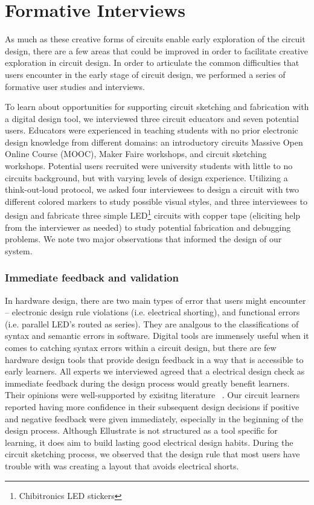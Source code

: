 \documentclass{sigchi}
\begin{document}
\section{Formative Interviews}
As much as these creative forms of circuits enable early exploration of the circuit design, there are a few areas that could be improved in order to facilitate creative exploration in circuit design. In order to articulate the common difficulties that users encounter in the early stage of circuit design, we performed a series of formative user studies and interviews. 

To learn about opportunities for supporting circuit sketching and fabrication with a digital design tool, we interviewed three circuit educators and seven potential users. 
Educators were experienced in teaching students with no prior electronic design knowledge from different domains: an introductory circuits Massive Open Online Course (MOOC), Maker Faire workshops, and circuit sketching workshops. 
Potential users recruited were university students with little to no circuits background, but with varying levels of design experience. Utilizing a think-out-loud protocol, we asked four interviewees to design a circuit with two different colored markers to study possible visual styles, and three interviewees to design and fabricate three simple  LED\footnote{Chibitronics LED stickers} circuits with copper tape (eliciting help from the interviewer as needed) to study potential fabrication and debugging problems. We note two major observations that informed the design of our system.

\subsubsection{Immediate feedback and validation}
In hardware design, there are two main types of error that users might encounter -- electronic design rule violations (i.e. electrical shorting), and functional errors (i.e. parallel LED's routed as series). They are analgous to the classifications of syntax and semantic errors in software. Digital tools are immensely useful when it comes to catching syntax errors within a circuit design, but there are few hardware design tools that provide design feedback in a way that is accessible to early learners. All experts we interviewed agreed that a electrical design check as immediate feedback during the design process would greatly benefit learners. Their opinions were well-supported by exisitng literature ~\cite{Hattie:2007gi,Epstein:2002ur}. Our circuit learners reported having more confidence in their subsequent design decisions if positive and negative feedback were given immediately, especially in the beginning of the design process. Although Ellustrate is not structured as a tool specific for learning, it does aim to build lasting good electrical design habits. During the circuit sketching process, we observed that the design rule that most users have trouble with was creating a layout that avoids electrical shorts.
\end{document}
